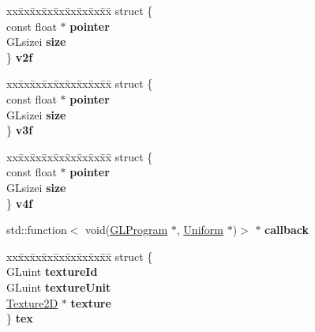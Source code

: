 \begin{DoxyCompactItemize}
\begin{tabbing}
\end{tabbing}\item 
\mbox{\label{unionUniformValue_1_1U_ad8c3aaca5ab14e17b73f4819915b73ec}} 
\begin{tabbing}
xx\=xx\=xx\=xx\=xx\=xx\=xx\=xx\=xx\=\kill
struct \{\\
\>const float $\ast$ {\bfseries pointer}\\
\>GLsizei {\bfseries size}\\
\} {\bfseries v2f}\\

\end{tabbing}\item 
\mbox{\label{unionUniformValue_1_1U_acec9a10628328fe62a2f6e02644cca2a}} 
\begin{tabbing}
xx\=xx\=xx\=xx\=xx\=xx\=xx\=xx\=xx\=\kill
struct \{\\
\>const float $\ast$ {\bfseries pointer}\\
\>GLsizei {\bfseries size}\\
\} {\bfseries v3f}\\

\end{tabbing}\item 
\mbox{\label{unionUniformValue_1_1U_ae562449e3f013eefb49f67d7494d0527}} 
\begin{tabbing}
xx\=xx\=xx\=xx\=xx\=xx\=xx\=xx\=xx\=\kill
struct \{\\
\>const float $\ast$ {\bfseries pointer}\\
\>GLsizei {\bfseries size}\\
\} {\bfseries v4f}\\

\end{tabbing}\item 
\mbox{\label{unionUniformValue_1_1U_a6d48282dd6cc282accecda40b64a8ac3}} 
std\+::function$<$ void(\hyperlink{classGLProgram}{G\+L\+Program} $\ast$, \hyperlink{structUniform}{Uniform} $\ast$)$>$ $\ast$ {\bfseries callback}
\item 
\mbox{\label{unionUniformValue_1_1U_ace6edb196931e5c14f94cfddcd6b4e43}} 
\begin{tabbing}
xx\=xx\=xx\=xx\=xx\=xx\=xx\=xx\=xx\=\kill
struct \{\\
\>GLuint {\bfseries textureId}\\
\>GLuint {\bfseries textureUnit}\\
\>\hyperlink{classTexture2D}{Texture2D} $\ast$ {\bfseries texture}\\
\} {\bfseries tex}\\


\end{tabbing}
\end{DoxyCompactItemize}
